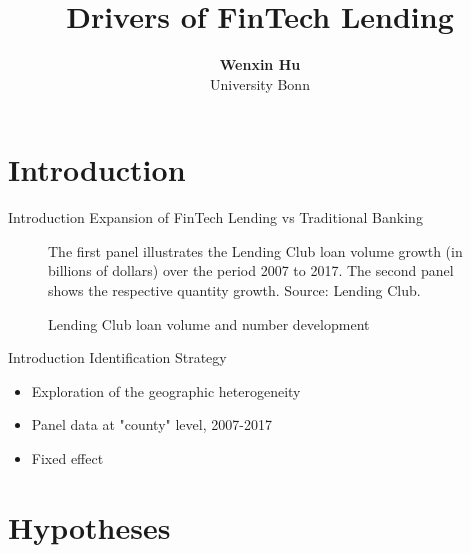 \documentclass[11pt]{beamer}
\begin{document}
\title{Drivers of FinTech Lending}

\author[Wenxin Hu]
{
{\bf Wenxin Hu}\\
{\small University Bonn}\\[1ex]
}


\begin{frame}
    \titlepage
    \note{~}
\end{frame}



\section{Introduction}

\begin{frame}{Introduction}
    Expansion of FinTech Lending vs Traditional Banking
    \begin{figure}
        \centering
        \caption{Lending Club loan volume and number development}
        \vspace{0.1cm}
        \hspace{0.25cm} \parbox{10cm}{\scriptsize The first panel illustrates the Lending Club loan volume growth (in billions of dollars) over the period 2007 to 2017. The second panel shows the respective quantity growth. Source: Lending Club.}
    \end{figure}
\end{frame}


\begin{frame}{Introduction}
    Identification Strategy
    \begin{itemize}
        \item Exploration of the geographic heterogeneity
        \item Panel data at "county" level, 2007-2017
        \item Fixed effect
    \end{itemize}
\end{frame}


\section{Hypotheses}
\end{document}
